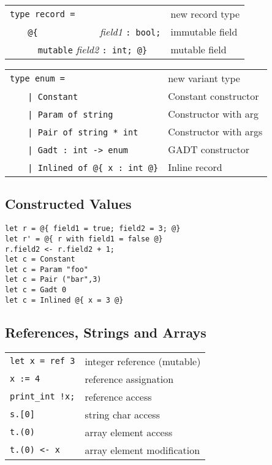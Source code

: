\documentclass[10pt,landscape]{article}
\begin{document}
\begin{multicols}{3}
\begin{tabular}{ll}
\Verb!type record =! & new record type \\
~~~ \Verb!@{!~~~~~~~~~~~~ \emph{field1} \Verb!: bool;! & immutable field \\
~~~ \Verb!  mutable! \emph{field2} \Verb!: int; @}! & mutable field \\
\end{tabular}
\begin{tabular}{ll}
\Verb!type enum =! & new variant type \\
~~~ \Verb!| Constant! & Constant constructor \\
~~~ \Verb!| Param of string! & Constructor with arg \\
~~~ \Verb!| Pair of string * int! & Constructor with args \\
~~~ \Verb!| Gadt : int -> enum! & GADT constructor \\
~~~ \Verb!| Inlined of @{ x : int @}! & Inline record \\
\end{tabular}

\subsection{Constructed Values}

\begin{Verbatim}
let r = @{ field1 = true; field2 = 3; @}
let r' = @{ r with field1 = false @}
r.field2 <- r.field2 + 1;
let c = Constant
let c = Param "foo"
let c = Pair ("bar",3)
let c = Gadt 0
let c = Inlined @{ x = 3 @}
\end{Verbatim}

\subsection{References, Strings and Arrays}

\begin{tabular}{ll}
\Verb!let x = ref 3! & integer reference (mutable) \\
\Verb!x := 4! & reference assignation \\
\verb&print_int !x;& & reference access \\
\Verb!s.[0]! & string char access \\
\Verb!t.(0)! & array element access \\
\Verb!t.(0) <- x! & array element modification \\
\end{tabular}


\end{multicols}
\end{document}
